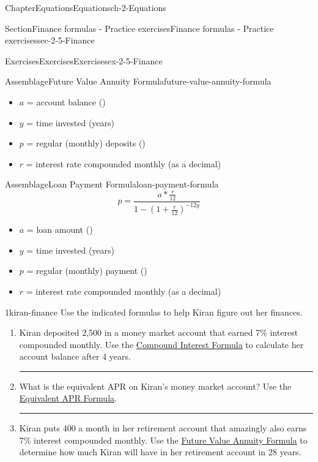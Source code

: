 \documentclass[twoside,11pt,]{book}
\newlength{\workspacestrutwidth}
\numberwithin{equation}{section}
\begin{document}
\begin{chapterptx}{Chapter}{Equations}{}{Equations}{}{}{ch-2-Equations}
\begin{sectionptx}{Section}{Finance formulas - Practice exercises}{}{Finance formulas - Practice exercises}{}{}{sec-2-5-Finance}
\begin{exercises-subsection-numberless}{Exercises}{Exercises}{}{Exercises}{}{}{ex-2-5-Finance}
\begin{assemblage}{Assemblage}{Future Value Annuity Formula}{future-value-annuity-formula}
%
\begin{itemize}[label=\textbullet]
\item{}\(a\) = account balance (\textdollar{})%
\item{}\(y\) = time invested (years)%
\item{}\(p\) = regular (monthly) deposits (\textdollar{})%
\item{}\(r\) = interest rate compounded monthly (as a decimal)%
\end{itemize}
%
\end{assemblage}
 \begin{assemblage}{Assemblage}{Loan Payment Formula}{loan-payment-formula}%
%
\begin{equation*}
p = \frac{a  \ast \frac{r}{12}}{1-\left( 1 + \frac{r}{12}\right) ^{-12y}}
\end{equation*}
%
\begin{itemize}[label=\textbullet]
\item{}\(a\) = loan amount (\textdollar{})%
\item{}\(y\) = time invested (years)%
\item{}\(p\) = regular (monthly) payment (\textdollar{})%
\item{}\(r\) = interest rate compounded monthly (as a decimal)%
\end{itemize}
%
\end{assemblage}
\clearpage
\begin{divisionexercise}{1}{}{}{kiran-finance}%
Use the indicated formulas to help Kiran figure out her finances.%
\begin{enumerate}[label=(\alph*),ref=\alph*]%
\item{}Kiran deposited \textdollar{}2,500 in a money market account that earned 7\% interest compounded monthly. Use the \hyperref[compound-interest-formula]{Compound Interest Formula} to calculate her account balance after 4 years.%
\par\rule{\workspacestrutwidth}{1.2in}%
\item{}What is the equivalent APR on Kiran's money market account? Use the \hyperref[equivalent-apr-formula]{Equivalent APR Formula}.%
\par\rule{\workspacestrutwidth}{1.2in}%
\item{}Kiran puts \textdollar{}400 a month in her retirement account that amazingly also earns 7\% interest compounded monthly. Use the \hyperref[future-value-annuity-formula]{Future Value Annuity Formula} to determine how much Kiran will have in her retirement account in 28 years.%

\end{enumerate}
\end{divisionexercise}
\end{exercises-subsection-numberless}
\end{sectionptx}
\end{chapterptx}
\end{document}
